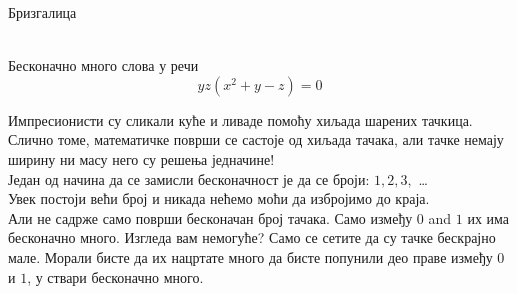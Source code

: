 \documentclass[sr]{./../../common/SurferDesc}%
\begin{document}
\footnotesize


\begin{surferPage}
  \begin{surferTitle}Бризгалица\end{surferTitle}   \\
Бесконачно много слова у речи\\
\smallskip
\[y z (x^2	+ y - z)	= 0\]

\vspace{0.3cm}
Импресионисти су сликали куће и ливаде помоћу хиљада шарених тачкица. Слично томе, математичке површи се састоје од хиљада тачака, али тачке немају ширину ни масу него су решења једначине! \\
\vspace{0.3cm}
Један од начина да се замисли бесконачност је да се броји: $1, 2, 3,$ \dots\\
Увек постоји већи број и никада нећемо моћи да избројимо до краја.\\
\vspace{0.3cm}
Али не садрже само површи бесконачан број тачака. Само између $0$ and $1$ их има бесконачно много. Изгледа вам немогуће? Само се сетите да су тачке бескрајно мале. Морали бисте да их нацртате много да бисте попунили део праве између $0$ и $1$, у ствари бесконачно много.




  \begin{surferText}
     \end{surferText}
\end{surferPage}
\end{document}
